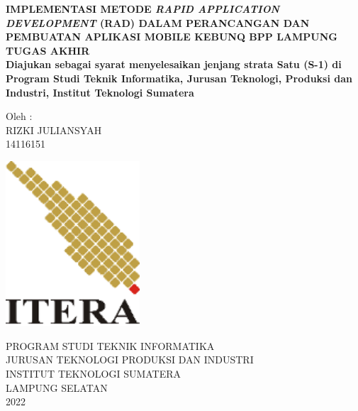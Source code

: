 \begin{titlepage}
\begin{center}
	

	\onehalfspacing
	\large \bfseries IMPLEMENTASI METODE \textit{RAPID APPLICATION DEVELOPMENT} (RAD) DALAM PERANCANGAN DAN PEMBUATAN APLIKASI MOBILE KEBUNQ BPP LAMPUNG\\
	\vspace{2cm}
	 \large TUGAS AKHIR \\
	 \normalfont \normalsize Diajukan sebagai syarat menyelesaikan jenjang strata Satu (S-1) di Program Studi Teknik Informatika, Jurusan Teknologi, Produksi dan Industri, Institut Teknologi Sumatera\\
	 
	\vspace{1cm}
	
	
	\large Oleh : \\
	RIZKI JULIANSYAH \\
	14116151
	
	\vspace{1cm}
	\includegraphics[width=5cm]{images/logo-itera.png}\\
	\vspace{2cm}
	
	\large PROGRAM STUDI TEKNIK INFORMATIKA \\
	JURUSAN TEKNOLOGI PRODUKSI DAN INDUSTRI \\
	INSTITUT TEKNOLOGI SUMATERA \\
	LAMPUNG SELATAN \\
	2022
	

	
	
\end{center}

\end{titlepage}

\newpage